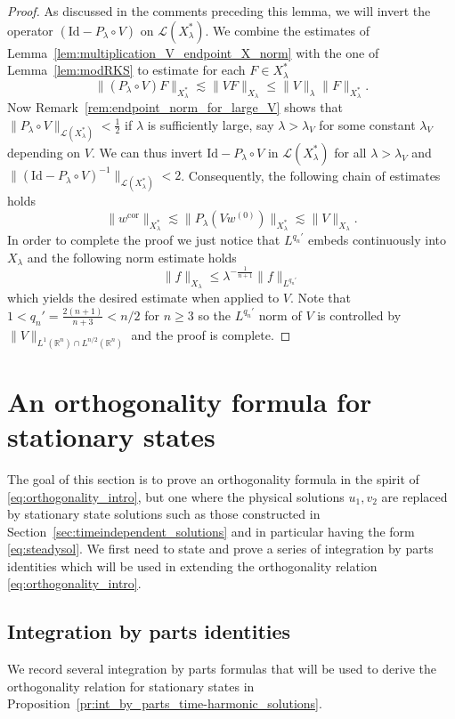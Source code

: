 \documentclass[11pt,a4paper]{amsart}
\theoremstyle{remark}
\theoremstyle{definition}
\newcommand{\R}{\mathbb{R}}
\begin{document}
\begin{proof} As discussed in the comments preceding this lemma, we will invert the operator $(\mathrm{Id}-P_\lambda \circ V)$ on $\mathcal L(X_\lambda ^*)$. We combine the estimates of Lemma~\ref{lem:multiplication_V_endpoint_X_norm} with the one of Lemma~\ref{lem:modRKS} to estimate for each 
$F\in X_\lambda ^*$ 
\[
\|(P_\lambda \circ V )F\|_{X_\lambda ^*} \lesssim \|VF\|_{X_\lambda}\leq \|V\|_\lambda \|F\|_{X_\lambda ^*}.
\]
Now Remark~\ref{rem:endpoint_norm_for_large_V} shows that $\|P_\lambda \circ V \|_{\mathcal L(X_\lambda ^*)}<\frac{1}{2}$ if $\lambda$ is sufficiently large, say $\lambda>\lambda_V$ for some constant $\lambda_V$ depending on $V$. We can thus invert $\mathrm{Id}-P_\lambda\circ V$ in $\mathcal L(X_\lambda ^*)$ for all $\lambda>\lambda _V$ and $\|(\mathrm{Id}-P_\lambda\circ V)^{-1}\|_{\mathcal L(X_\lambda ^*)}<2$. Consequently, the following chain of estimates holds
\[
\|w^{\mathrm{cor}} \|_{X_\lambda ^*}\lesssim \|P_\lambda(Vw^{(0)})\|_{X_\lambda ^*}\lesssim \|V\|_{X_\lambda}.
\]
In order to complete the proof we just notice that $L^{q_n '}$ embeds continuously into $X_\lambda$ and the following norm estimate holds
\[
\| f\|_{X_\lambda} \leq \lambda^{-\frac{1}{n+1}}\|f\|_{L^{q_n '}}
\]
which yields the desired estimate when applied to $V$. Note that $1<q_n '=\frac{2(n+1)}{n+3}<n/2$ for $n\geq 3$ so the $L^{q_n '}$ norm of $V$ is controlled by $\|V\|_{L^1(\R^n)\cap L^{n/2}(\R^n)}$ and the proof is complete.
\end{proof}


\section{An orthogonality formula for stationary states}\label{sec:orthorelation} The goal of this section is to prove an orthogonality formula in the spirit of \eqref{eq:orthogonality_intro}, but one where the physical solutions $u_1,v_2$ are replaced by stationary state solutions such as those constructed in Section~\ref{sec:timeindependent_solutions} and in particular having the form \eqref{eq:steadysol}. We first need to state and prove a series of integration by parts identities which will be used in extending the orthogonality relation \eqref{eq:orthogonality_intro}. 


\subsection{Integration by parts identities} We record several integration by parts formulas that will be used to derive the orthogonality relation for stationary states in Proposition~\ref{pr:int_by_parts_time-harmonic_solutions}.
\end{document}
